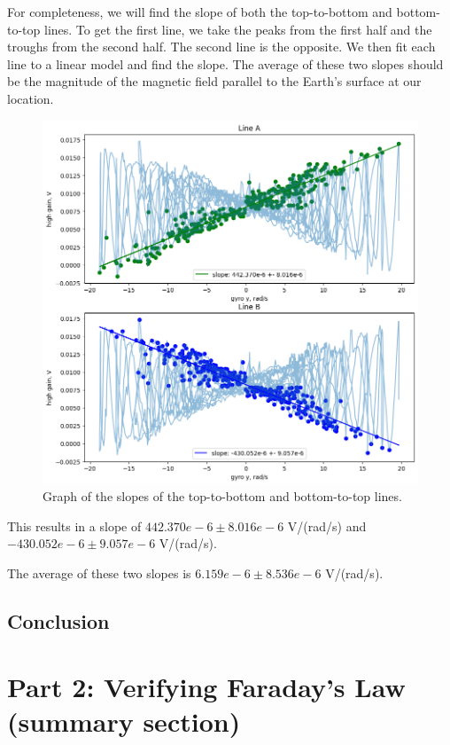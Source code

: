 \documentclass[11pt]{article}
\let\oldsection\section
\renewcommand\section{\clearpage\oldsection}
\begin{document}
    For completeness, we will find the slope of both the top-to-bottom and bottom-to-top lines.
    To get the first line, we take the peaks from the first half and the troughs from the second half.
    The second line is the opposite.
    We then fit each line to a linear model and find the slope.
    The average of these two slopes should be the magnitude of the magnetic field parallel to the Earth's surface at our location.

    \begin{figure}[H]
        \centering
        \includegraphics[width=0.8\linewidth]{resources/images/part 1 slopes}
        \caption{Graph of the slopes of the top-to-bottom and bottom-to-top lines.}
        \label{fig:part_1_slopes}
    \end{figure}

    This results in a slope of $442.370e-6 \pm 8.016e-6$ V/(rad/s) and $-430.052e-6 \pm 9.057e-6$ V/(rad/s).

    The average of these two slopes is $6.159e-6 \pm 8.536e-6$ V/(rad/s).

    \subsection{Conclusion}\label{subsec:part_1_conclusion}


    \section{Part 2: Verifying Faraday’s Law (summary section)}\label{sec:part_2}
\end{document}
